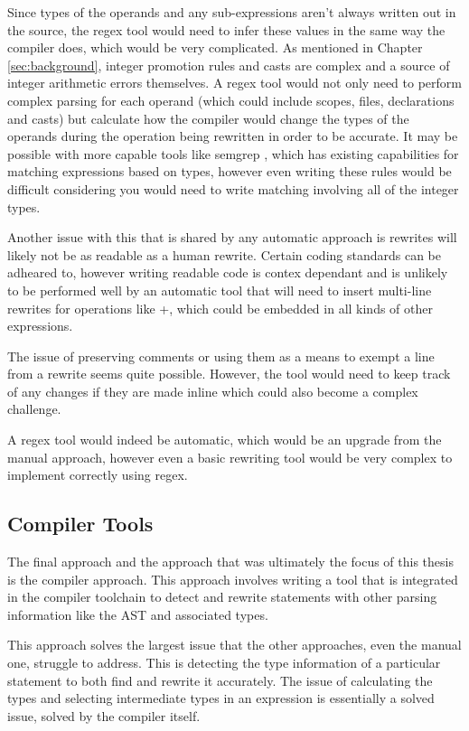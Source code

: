 Since types of the operands and any sub-expressions aren't always written out in the source, the regex tool would need to infer these values in the same way the compiler does, which would be very complicated. As mentioned in Chapter \ref{sec:background}, integer promotion rules and casts are complex and a source of integer arithmetic errors themselves. A regex tool would not only need to perform complex parsing for each operand (which could include scopes, files, declarations and casts) but calculate how the compiler would change the types of the operands during the operation being rewritten in order to be accurate. It may be possible with more capable tools like semgrep \cite{semgrep}, which has existing capabilities for matching expressions based on types, however even writing these rules would be difficult considering you would need to write matching involving all of the integer types.

Another issue with this that is shared by any automatic approach is rewrites will likely not be as readable as a human rewrite. Certain coding standards can be adheared to, however writing readable code is contex dependant and is unlikely to be performed well by an automatic tool that will need to insert multi-line rewrites for operations like +, which could be embedded in all kinds of other expressions.

The issue of preserving comments or using them as a means to exempt a line from a rewrite seems quite possible. However, the tool would need to keep track of any changes if they are made inline which could also become a complex challenge.

A regex tool would indeed be automatic, which would be an upgrade from the manual approach, however even a basic rewriting tool would be very complex to implement correctly using regex.

\subsection{Compiler Tools}

The final approach and the approach that was ultimately the focus of this thesis is the compiler approach.
This approach involves writing a tool that is integrated in the compiler toolchain to detect and rewrite statements with other parsing information like the AST and associated types.

This approach solves the largest issue that the other approaches, even the manual one, struggle to address. This is detecting the type information of a particular statement to both find and rewrite it accurately. The issue of calculating the types and selecting intermediate types in an expression is essentially a solved issue, solved by the compiler itself.

